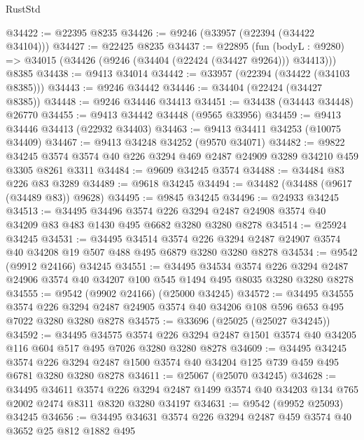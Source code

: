 \begin{lexlean}{RustStd}
\begin{coremodule}
@34422 := @22395 @8235
@34426 := @9246 (@33957 (@22394 (@34422 @34104)))
@34427 := @22425 @8235
@34437 := @22895
    (fun (bodyL : @9280) => @34015 (@34426 (@9246 (@34404 (@22424 (@34427 @9264))) @34413)))
    @8385
@34438 := @9413 @34014
@34442 := @33957 (@22394 (@34422 (@34103 @8385)))
@34443 := @9246 @34442
@34446 := @34404 (@22424 (@34427 @8385))
@34448 := @9246 @34446 @34413
@34451 := @34438 (@34443 @34448) @26770
@34455 := @9413 @34442 @34448 (@9565 @33956)
@34459 := @9413 @34446 @34413 (@22932 @34403)
@34463 := @9413 @34411 @34253 (@10075 @34409)
@34467 := @9413 @34248 @34252 (@9570 @34071)
@34482 := @9822
    @34245
    @3574
    @3574
    @40
    @226
    @3294
    @469
    @2487
    @24909
    @3289
    @34210
    @459
    @3305
    @8261
    @3311
@34484 := @9609 @34245 @3574
@34488 := @34484 @83 @226 @83 @3289
@34489 := @9618 @34245
@34494 := @34482 (@34488 (@9617 (@34489 @83)) @9628)
@34495 := @9845 @34245
@34496 := @24933 @34245
@34513 := @34495
    @34496
    @3574
    @226
    @3294
    @2487
    @24908
    @3574
    @40
    @34209
    @83
    @483
    @1430
    @495
    @6682
    @3280
    @3280
    @8278
@34514 := @25924 @34245
@34531 := @34495
    @34514
    @3574
    @226
    @3294
    @2487
    @24907
    @3574
    @40
    @34208
    @19
    @507
    @488
    @495
    @6879
    @3280
    @3280
    @8278
@34534 := @9542 (@9912 @24166) @34245
@34551 := @34495
    @34534
    @3574
    @226
    @3294
    @2487
    @24906
    @3574
    @40
    @34207
    @100
    @545
    @1494
    @495
    @8035
    @3280
    @3280
    @8278
@34555 := @9542 (@9902 @24166) (@25000 @34245)
@34572 := @34495
    @34555
    @3574
    @226
    @3294
    @2487
    @24905
    @3574
    @40
    @34206
    @108
    @596
    @653
    @495
    @7022
    @3280
    @3280
    @8278
@34575 := @33696 (@25025 (@25027 @34245))
@34592 := @34495
    @34575
    @3574
    @226
    @3294
    @2487
    @1501
    @3574
    @40
    @34205
    @116
    @604
    @517
    @495
    @7026
    @3280
    @3280
    @8278
@34609 := @34495
    @34245
    @3574
    @226
    @3294
    @2487
    @1500
    @3574
    @40
    @34204
    @125
    @739
    @459
    @495
    @6781
    @3280
    @3280
    @8278
@34611 := @25067 (@25070 @34245)
@34628 := @34495
    @34611
    @3574
    @226
    @3294
    @2487
    @1499
    @3574
    @40
    @34203
    @134
    @765
    @2002
    @2474
    @8311
    @8320
    @3280
    @34197
@34631 := @9542 (@9952 @25093) @34245
@34656 := @34495
    @34631
    @3574
    @226
    @3294
    @2487
    @459
    @3574
    @40
    @3652
    @25
    @812
    @1882
    @495

\end{coremodule}
\end{lexlean}
